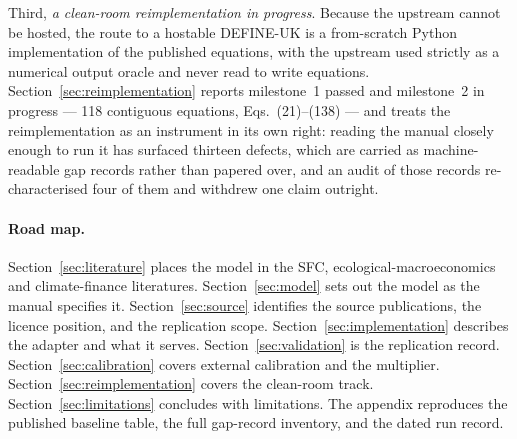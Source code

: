Third, \emph{a clean-room reimplementation in progress}. Because the upstream cannot be hosted, the route to a hostable DEFINE-UK is a from-scratch Python implementation of the published equations, with the upstream used strictly as a numerical output oracle and never read to write equations. Section~\ref{sec:reimplementation} reports milestone~1 passed and milestone~2 in progress --- 118 contiguous equations, Eqs.~(21)--(138) --- and treats the reimplementation as an instrument in its own right: reading the manual closely enough to run it has surfaced thirteen defects, which are carried as machine-readable gap records rather than papered over, and an audit of those records re-characterised four of them and withdrew one claim outright.

\paragraph{Road map.} Section~\ref{sec:literature} places the model in the SFC, ecological-macroeconomics and climate-finance literatures. Section~\ref{sec:model} sets out the model as the manual specifies it. Section~\ref{sec:source} identifies the source publications, the licence position, and the replication scope. Section~\ref{sec:implementation} describes the adapter and what it serves. Section~\ref{sec:validation} is the replication record. Section~\ref{sec:calibration} covers external calibration and the multiplier. Section~\ref{sec:reimplementation} covers the clean-room track. Section~\ref{sec:limitations} concludes with limitations. The appendix reproduces the published baseline table, the full gap-record inventory, and the dated run record.

